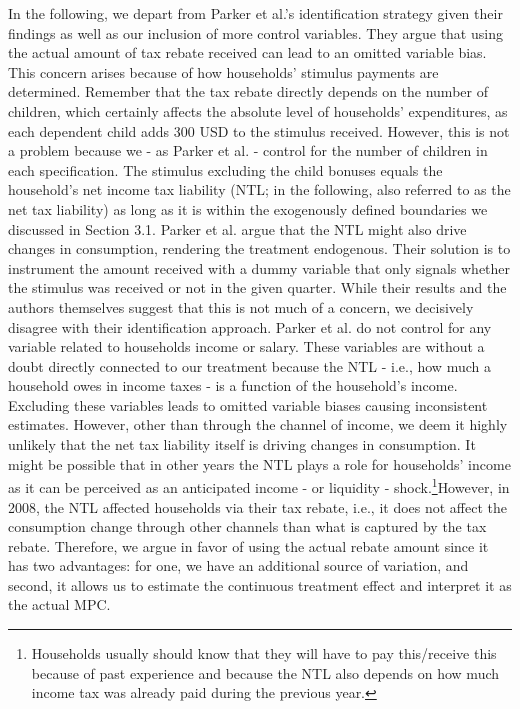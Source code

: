 In the following, we depart from Parker et al.'s identification strategy given their findings as well as our inclusion of more control variables. They argue that using the actual amount of tax rebate received can lead to an omitted variable bias. This concern arises because of how households' stimulus payments are determined. Remember that the tax rebate directly depends on the number of children, which certainly affects the absolute level of households' expenditures, as each dependent child adds 300 USD to the stimulus received. However, this is not a problem because we - as Parker et al. - control for the number of children in each specification. The stimulus excluding the child bonuses equals the household's net income tax liability (NTL; in the following, also referred to as the net tax liability) as long as it is within the exogenously defined boundaries we discussed in Section 3.1. Parker et al. argue that the NTL might also drive changes in consumption, rendering the treatment endogenous. Their solution is to instrument the amount received with a dummy variable that only signals whether the stimulus was received or not in the given quarter. While their results and the authors themselves suggest that this is not much of a concern, we decisively disagree with their identification approach. Parker et al. do not control for any variable related to households income or salary. These variables are without a doubt directly connected to our treatment because the NTL - i.e., how much a household owes in income taxes - is a function of the household's income. Excluding these variables leads to omitted variable biases causing inconsistent estimates. However, other than through the channel of income, we deem it highly unlikely that the net tax liability itself is driving changes in consumption. It might be possible that in other years the NTL plays a role for households' income as it can be perceived as an anticipated income - or liquidity - shock.\footnote{Households usually should know that they will have to pay this/receive this because of past experience and because the NTL also depends on how much income tax was already paid during the previous year.}However, in 2008, the NTL affected households via their tax rebate, i.e., it does not affect the consumption change through other channels than what is captured by the tax rebate. Therefore, we argue in favor of using the actual rebate amount since it has two advantages: for one, we have an additional source of variation, and second, it allows us to estimate the continuous treatment effect and interpret it as the actual MPC. 

